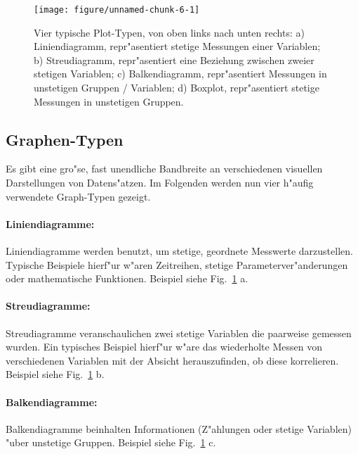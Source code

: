 \documentclass[a4paper,twoside]{tufte-book}\usepackage[]{graphicx}\usepackage[]{color}
\makeatletter
\def\maxwidth{ %
  \ifdim\Gin@nat@width>\linewidth
    \linewidth
  \else
    \Gin@nat@width
  \fi
}
\makeatother
\begin{document}
\begin{figure}[htbp]
\begin{center}

\begin{Schunk}

\texttt{[image: figure/unnamed-chunk-6-1]} \end{Schunk}
\caption{Vier typische Plot-Typen, von oben links nach unten rechts: a) Liniendiagramm, repr"asentiert stetige Messungen einer Variablen; b) Streudiagramm, repr"asentiert eine Beziehung zwischen zweier stetigen Variablen; c) Balkendiagramm, repr"asentiert Messungen in unstetigen Gruppen / Variablen; d) Boxplot, repr"asentiert stetige Messungen in unstetigen Gruppen.}
\label{fig: exaple plots}
\end{center}
\end{figure}


\subsection{Graphen-Typen}

Es gibt eine gro"se, fast unendliche Bandbreite an verschiedenen visuellen Darstellungen von Datens"atzen. Im Folgenden werden nun vier h"aufig verwendete Graph-Typen gezeigt. 

\paragraph{Liniendiagramme:} Liniendiagramme werden benutzt, um stetige, geordnete Messwerte darzustellen. Typische Beispiele hierf"ur w"aren Zeitreihen, stetige Parameterver"anderungen oder mathematische Funktionen. Beispiel siehe Fig.~\ref{fig: exaple plots} a.

\paragraph{Streudiagramme:} Streudiagramme veranschaulichen zwei stetige Variablen die paarweise gemessen wurden. Ein typisches Beispiel hierf"ur w"are das wiederholte Messen von verschiedenen Variablen mit der Absicht herauszufinden, ob diese korrelieren. Beispiel siehe Fig.~\ref{fig: exaple plots} b.

\paragraph{Balkendiagramme:} Balkendiagramme beinhalten Informationen (Z"ahlungen oder stetige Variablen) "uber unstetige Gruppen. Beispiel siehe Fig.~\ref{fig: exaple plots} c.
\end{document}
